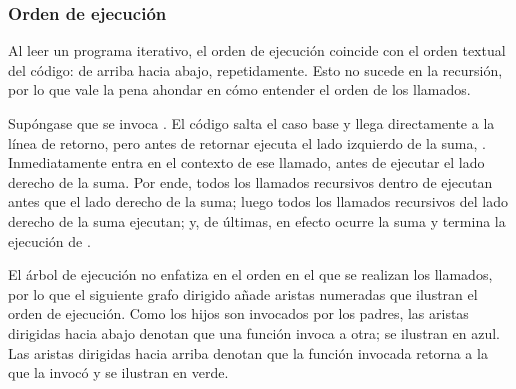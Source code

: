 \subsubsection{Orden de ejecución}

Al leer un programa iterativo, el orden de ejecución coincide con el orden textual del código: de arriba hacia abajo, repetidamente. Esto no sucede en la recursión, por lo que vale la pena ahondar en cómo entender el orden de los llamados.

Supóngase que se invoca . El código salta el caso base y llega directamente a la línea de retorno, pero antes de retornar ejecuta el lado izquierdo de la suma, . Inmediatamente entra en el contexto de ese llamado, antes de ejecutar el lado derecho de la suma. Por ende, todos los llamados recursivos dentro de  ejecutan antes que el lado derecho de la suma; luego todos los llamados recursivos del lado derecho de la suma ejecutan; y, de últimas, en efecto ocurre la suma y termina la ejecución de .

El árbol de ejecución no enfatiza en el orden en el que se realizan los llamados, por lo que el siguiente grafo dirigido añade aristas numeradas que ilustran el orden de ejecución. Como los hijos son invocados por los padres, las aristas dirigidas hacia abajo denotan que una función invoca a otra; se ilustran en azul. Las aristas dirigidas hacia arriba denotan que la función invocada retorna a la que la invocó y se ilustran en verde.


